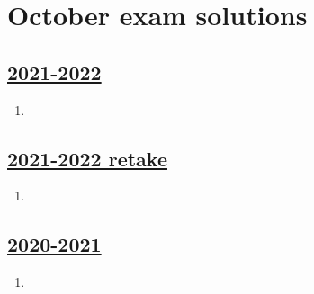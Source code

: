 
\newpage
\thispagestyle{empty}
\section{October exam solutions}
 

\subsection[2021-2022]{\hyperref[sec:kr_01_2021_2022]{2021-2022}}
\label{sec:sol_kr_01_2021_2022} %



\begin{enumerate}

\item 


\end{enumerate}
    

\subsection[2021-2022 retake]{\hyperref[sec:kr_01_2021_2022_retake]{2021-2022 retake}}
\label{sec:sol_kr_01_2021_2022_retake} %



\begin{enumerate}

\item 


\end{enumerate}



\subsection[2020-2021]{\hyperref[sec:kr_01_2020_2021]{2020-2021}}
\label{sec:sol_kr_01_2020_2021} %



\begin{enumerate}
    
    
    
    \item
 
 
\end{enumerate}


